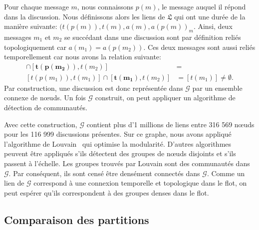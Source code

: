 Pour chaque message $m$, nous connaissons $p(m)$, le message auquel il répond dans la discussion.
Nous définissons alors les liens de $\mathfrak{L}$ qui ont une durée de la manière suivante: ${(t(p(m)),t(m),a(m),a(p(m))}_m$.
Ainsi, deux messages $m_1$ et $m_2$ se succédant dans une discussion sont par définition reliés topologiquement car $a(m_1)= a(p(m_2))$.
Ces deux messages sont aussi reliés temporellement car nous avons la relation suivante:
\begin{align*}
[t(p(m_1)),t(m_1)]\cap [\mathbf{t(p(m_2))},t(m_2)] &= \\
[t(p(m_1)),t(m_1)]\cap [\mathbf{t(m_1)},t(m_2)] &= [t(m_1)] \neq \emptyset.
\end{align*}
Par construction, une discussion est donc représentée dans $\mathcal{G}$ par un ensemble connexe de n\oe{}uds.
Un fois $\mathcal{G}$ construit, on peut appliquer un algorithme de détection de communautés.

Avec cette construction, $\mathcal{G}$ contient plus d'1 millions de liens entre 316 569 n\oe{}uds pour les 116 999 discussions présentes.
Sur ce graphe, nous avons appliqué l'algorithme de Louvain~\cite{Blondel2008a} qui optimise la modularité.
D'autres algorithmes peuvent être appliqués s'ils détectent des groupes de n\oe{}uds disjoints et s'ils passent à l'échelle.
Les groupes trouvés par Louvain sont des communautés dans $\mathcal{G}$.
Par conséquent, ils sont censé être densément connectés dans $\mathcal{G}$.
Comme un lien de $\mathcal{G}$ correspond à une connexion temporelle et topologique dans le flot, on peut espérer qu'ils correspondent à des groupes denses dans le flot.

\subsection{Comparaison des partitions}

